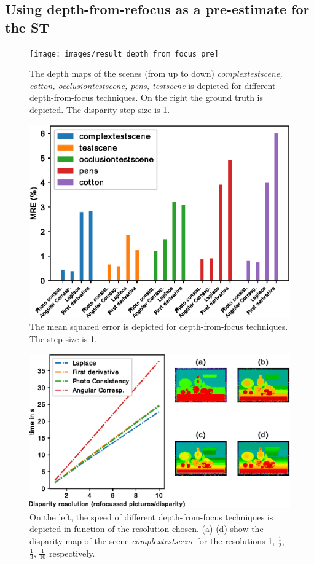 \documentclass  [
  paper    = a4,
  BCOR     = 10mm,
  twoside,
  fontsize = 12pt,
  fleqn,
  toc      = bibnumbered,
  toc      = listofnumbered,
  numbers  = noendperiod,
  headings = normal,
  listof   = leveldown,
  version  = 3.03
]                                       {scrreprt}
\begin{document}
	\subsection{Using depth-from-refocus as a pre-estimate for the ST}
	\begin{figure}[h!]
		\centering
		\texttt{[image: images/result\_depth\_from\_focus\_pre]}
		\caption[Depth from focus: depth maps with resolution 1]{The depth maps of the scenes (from up to down) \textit{complextestscene, cotton, occlusiontestscene, pens, testscene} is depicted for different depth-from-focus techniques. On the right the ground truth is depicted. The disparity step size is 1.}
		\label{fig:resultdepthfromfocuspre}
	\end{figure}
	\begin{figure}[h!]
	\centering
	\includegraphics[width=0.7\linewidth]{images/error_res1_all}
	\caption[Mean squared error for depth-from-focus techniques]{The mean squared error is depicted for depth-from-focus techniques. The step size is 1.}
	\label{fig:errorres1all}
	\end{figure}
	 \begin{figure}[h!]
	\centering
	\includegraphics[width=0.7\linewidth]{images/speeds.eps}
	\caption[Speed of different depth-from-focus techniques]{ On the left, the speed of different depth-from-focus techniques is depicted in function of the resolution chosen. (a)-(d) show the disparity map of the scene \textit{complextestscene} for the resolutions 1, $\frac{1}{2}$, $\frac{1}{3}$, $\frac{1}{10}$ respectively.}
	\label{fig:speeds}
	\end{figure}
\end{document}
